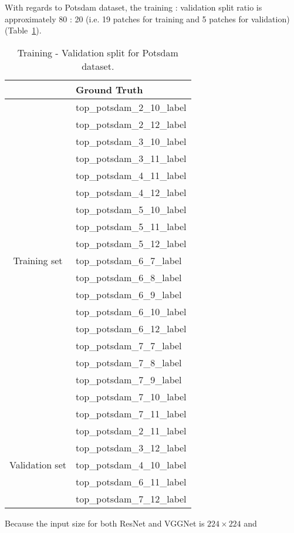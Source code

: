 With regards to Potsdam dataset, the training : validation split ratio is
approximately 80 : 20 (i.e. 19 patches for training and 5 patches for
validation) (Table~\ref{tab:potsdam_train_val}).
\begin{table}[h]
    \centering
    \begin{tabular}{ c | l }
        & Ground Truth \\
        \hline
        \multirow{19}{*}{Training set} & top\_potsdam\_2\_10\_label \\
        & top\_potsdam\_2\_12\_label \\
        & top\_potsdam\_3\_10\_label \\
        & top\_potsdam\_3\_11\_label \\
        & top\_potsdam\_4\_11\_label \\
        & top\_potsdam\_4\_12\_label \\
        & top\_potsdam\_5\_10\_label \\
        & top\_potsdam\_5\_11\_label \\
        & top\_potsdam\_5\_12\_label \\
        & top\_potsdam\_6\_7\_label \\
        & top\_potsdam\_6\_8\_label \\
        & top\_potsdam\_6\_9\_label \\
        & top\_potsdam\_6\_10\_label \\
        & top\_potsdam\_6\_12\_label \\
        & top\_potsdam\_7\_7\_label \\
        & top\_potsdam\_7\_8\_label \\
        & top\_potsdam\_7\_9\_label \\
        & top\_potsdam\_7\_10\_label \\
        & top\_potsdam\_7\_11\_label \\
        \hline
        \multirow{5}{*}{Validation set} & top\_potsdam\_2\_11\_label \\
        & top\_potsdam\_3\_12\_label \\
        & top\_potsdam\_4\_10\_label \\
        & top\_potsdam\_6\_11\_label \\
        & top\_potsdam\_7\_12\_label
    \end{tabular}
    \caption{Training - Validation split for Potsdam dataset.}
    \label{tab:potsdam_train_val}
\end{table}
Because the input size for both ResNet and VGGNet is $224 \times 224$ and
